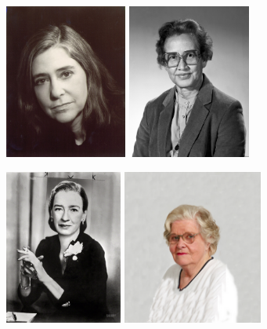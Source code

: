 \documentclass[xcolor={usenames,dvipsnames,svgnames,table},12pt]{beamer}
\begin{document}
\begin{frame}{}
  \begin{center}
    \includegraphics[height=2in]{Margaret-Hamilton.jpeg} \quad
    \includegraphics[height=2in]{katherine-johnson.jpeg}
  \end{center}
\end{frame}

\begin{frame}{}
  \begin{center}
    \includegraphics[height=2in]{grace-hopper.jpg} \quad
    \includegraphics[height=2in]{jean-bartik-cropped.png}
  \end{center}
\end{frame}
\end{document}
